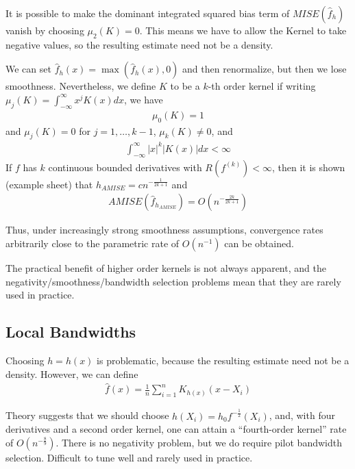 It is possible to make the dominant integrated squared bias term of
$MISE(\hat f_{h})$ vanish by choosing $\mu_{2}(K) = 0$.  This means
we have to allow the Kernel to take negative values, so the resulting
estimate need not be a density.

We can set $\hat f_{h}(x) = \max (\hat f_{h}(x), 0)$ and then
renormalize, but then we lose smoothness.  Nevertheless, we define $K$
to be a $k$-th order kernel if writing $\mu_{j}(K) =
\int_{-\infty}^{\infty} x^{j} K(x) dx$, we have
\begin{align}
  \label{eq:42}
  \mu_{0}(K) = 1
\end{align} and $\mu_{j}(K) = 0$ for $j = 1, \dots, k - 1$,
$\mu_{k}(K) \neq 0$, and
\begin{align}
  \label{eq:43}
  \int_{-\infty}^{\infty} |x|^{k} |K(x)| dx < \infty
\end{align} If $f$ has $k$ continuous bounded derivatives with
$R(f^{(k)}) < \infty$, then it is shown (example sheet) that
$h_{AMISE} = c n^{-\frac{1}{2k+1}}$ and
\begin{align}
  \label{eq:44}
  AMISE(\hat f_{h_{AMISE}}) = O(n^{-\frac{2k}{2k+1}})
\end{align}

Thus, under increasingly strong smoothness assumptions, convergence
rates arbitrarily close to the parametric rate of $O(n^{-1})$ can be
obtained.

The practical benefit of higher order kernels is not always apparent,
and the negativity/smoothness/bandwidth selection problems mean that
they are rarely used in practice.

\subsection{Local Bandwidths}
\label{sec:local-bandwidths}

Choosing $h = h(x)$  is problematic, because the resulting estimate
need not be a density.  However, we can define
\begin{align}
  \label{eq:45}
  \hat f(x) = \frac{1}{n} \sum_{i=1}^{n} K_{h(x)}(x - X_{i})
\end{align}

Theory suggests that we should choose $h(X_{i}) = h_{0}
f^{-\frac{1}{2}}(X_{i})$, and, with four derivatives and a second
order kernel, one can attain a ``fourth-order kernel'' rate of
$O(n^{-\frac{8}{9}})$.  There is no negativity problem, but we do
require pilot bandwidth selection.  Difficult to tune well and rarely
used in practice.

